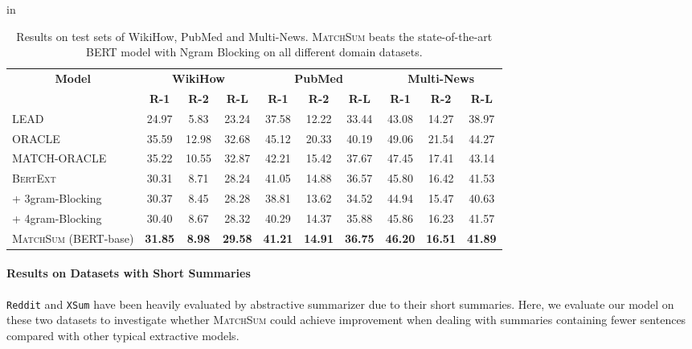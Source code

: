 \renewcommand\arraystretch{1.1}
\begin{table*}[t]
\center \footnotesize
{} in
\begin{tabular}{lccccccccc}
\toprule
\multicolumn{1}{c}{\multirow{2}[1]{*}{\textbf{Model}}}  &
\multicolumn{3}{c}{\textbf{WikiHow}} &
\multicolumn{3}{c}{\textbf{PubMed}} &
\multicolumn{3}{c}{\textbf{Multi-News}} \\

 & \textbf{R-1} & \textbf{R-2} & \textbf{R-L} &
\textbf{R-1} & \textbf{R-2} & \textbf{R-L} &
\textbf{R-1} & \textbf{R-2} & \textbf{R-L} \\

\cmidrule(lr){1-1} \cmidrule(lr){2-4} \cmidrule(lr){5-7} \cmidrule(lr){8-10}

LEAD & 24.97 & 5.83 & 23.24 & 37.58 & 12.22 & 33.44 & 43.08 & 14.27 & 38.97 \\
ORACLE & 35.59 & 12.98 & 32.68 & 45.12 & 20.33 & 40.19 & 49.06 & 21.54 & 44.27  \\
MATCH-ORACLE & 35.22 & 10.55 & 32.87 & 42.21 & 15.42 & 37.67 & 47.45 & 17.41 & 43.14 \\

\cmidrule(lr){1-1} \cmidrule(lr){2-4} \cmidrule(lr){5-7} \cmidrule(lr){8-10}
\textsc{BertExt} & 30.31 & 8.71	& 28.24 & 41.05 & 14.88	& 36.57 & 45.80 & 16.42 & 41.53 \\
\quad + 3gram-Blocking & 30.37 & 8.45 & 28.28 & 38.81 & 13.62 & 34.52 & 44.94 & 15.47 & 40.63 \\
\quad + 4gram-Blocking & 30.40 & 8.67 & 28.32 & 40.29 & 14.37 & 35.88 & 45.86 & 16.23 & 41.57 \\
\textsc{MatchSum} (BERT-base) & \textbf{31.85} & \textbf{8.98} & \textbf{29.58} & \textbf{41.21} & \textbf{14.91} & \textbf{36.75} & \textbf{46.20} & \textbf{16.51} & \textbf{41.89} \\

\bottomrule
\end{tabular}
\caption{Results on test sets of WikiHow, PubMed and Multi-News. \textsc{MatchSum} beats the state-of-the-art BERT model with Ngram Blocking on all different domain datasets.
}
\label{tab:ngram and match}
\end{table*}

\paragraph{Results on Datasets with Short Summaries}
\texttt{Reddit} and \texttt{XSum} have been heavily evaluated by abstractive summarizer due to their short summaries.
Here, we evaluate our model on these two datasets to investigate whether \textsc{MatchSum} could achieve improvement when dealing with summaries containing fewer sentences compared with other typical extractive models.

